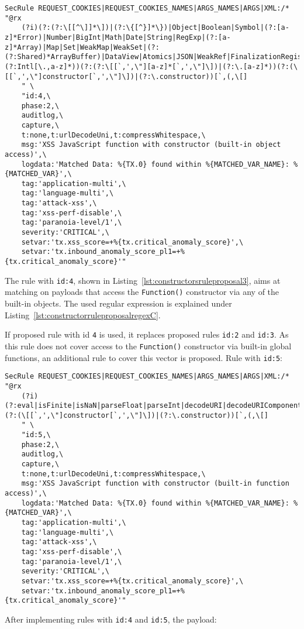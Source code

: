 \begin{lstlisting}[style=basicStyle, caption=Rule proposal to block usage of Function() constructor via built-in objects, label={lst:constructorsruleproposal3}]
SecRule REQUEST_COOKIES|REQUEST_COOKIES_NAMES|ARGS_NAMES|ARGS|XML:/* "@rx 
    (?i)(?:(?:\[[^\]]*\])|(?:\{[^}]*\})|Object|Boolean|Symbol|(?:[a-z]*Error)|Number|BigInt|Math|Date|String|RegExp|(?:[a-z]*Array)|Map|Set|WeakMap|WeakSet|(?:(?:Shared)*ArrayBuffer)|DataView|Atomics|JSON|WeakRef|FinalizationRegistry|Iterator|AsyncIterator|Promise|GeneratorFunction|AsyncGeneratorFunction|Generator|AsyncGenerator|AsyncFunction|Reflect|Proxy|(?:Intl[\.,a-z]*))(?:(?:\[[`,',\"][a-z]*[`,',\"]\])|(?:\.[a-z]*))(?:(\[[`,',\"]constructor[`,',\"]\])|(?:\.constructor))[`,(,\[] 
    " \
    "id:4,\
    phase:2,\
    auditlog,\
    capture,\
    t:none,t:urlDecodeUni,t:compressWhitespace,\
    msg:'XSS JavaScript function with constructor (built-in object access)',\
    logdata:'Matched Data: %{TX.0} found within %{MATCHED_VAR_NAME}: %{MATCHED_VAR}',\
    tag:'application-multi',\
    tag:'language-multi',\
    tag:'attack-xss',\
    tag:'xss-perf-disable',\
    tag:'paranoia-level/1',\
    severity:'CRITICAL',\
    setvar:'tx.xss_score=+%{tx.critical_anomaly_score}',\
    setvar:'tx.inbound_anomaly_score_pl1=+%{tx.critical_anomaly_score}'"
\end{lstlisting}
The rule with \verb|id:4|, shown in Listing~\ref{lst:constructorsruleproposal3}, aims at matching on payloads that access the \verb|Function()| constructor via any of the built-in objects. The used regular expression is explained under Listing~\ref{lst:constructorruleproposalregexC}.

If proposed rule with id \verb|4| is used, it replaces proposed rules \verb|id:2| and \verb|id:3|. As this rule does not cover access to the \verb|Function()| constructor via built-in global functions, an additional rule to cover this vector is proposed. Rule with \verb|id:5|:

\begin{lstlisting}[style=basicStyle, caption=Rule proposal to block usage of Function() constructor via built-in functions]
SecRule REQUEST_COOKIES|REQUEST_COOKIES_NAMES|ARGS_NAMES|ARGS|XML:/* "@rx 
    (?i)(?:eval|isFinite|isNaN|parseFloat|parseInt|decodeURI|decodeURIComponent|encodeURI|encodeURIComponent|escape|unescape)(?:(\[[`,',\"]constructor[`,',\"]\])|(?:\.constructor))[`,(,\[]
    " \
    "id:5,\
    phase:2,\
    auditlog,\
    capture,\
    t:none,t:urlDecodeUni,t:compressWhitespace,\
    msg:'XSS JavaScript function with constructor (built-in function access)',\
    logdata:'Matched Data: %{TX.0} found within %{MATCHED_VAR_NAME}: %{MATCHED_VAR}',\
    tag:'application-multi',\
    tag:'language-multi',\
    tag:'attack-xss',\
    tag:'xss-perf-disable',\
    tag:'paranoia-level/1',\
    severity:'CRITICAL',\
    setvar:'tx.xss_score=+%{tx.critical_anomaly_score}',\
    setvar:'tx.inbound_anomaly_score_pl1=+%{tx.critical_anomaly_score}'"
\end{lstlisting}
After implementing rules with \verb|id:4| and \verb|id:5|, the payload:

